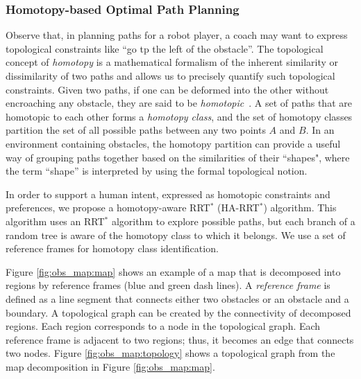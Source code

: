 \documentclass[phd]{byuprop}
\begin{document}
\subsubsection{Homotopy-based Optimal Path Planning}
\label{sec:project_description:homotopy_based_path_planning}

Observe that, in planning paths for a robot player, a coach may want to express topological constraints like ``go tp the left of the obstacle''.
The topological concept of \emph{homotopy} is a mathematical formalism of the inherent similarity or dissimilarity of two paths and allows us to precisely quantify such topological constraints.
Given two paths, if one can be deformed into the other without encroaching any obstacle, they are said to be \emph{homotopic}~\cite{Hernandez2015}.
A set of paths that are homotopic to each other forms a \emph{homotopy class}, and the  set of homotopy classes partition the set of all possible paths between any two points $A$ and $B$.
In an environment containing obstacles, the homotopy partition can provide a useful way of grouping paths together based on the similarities of their ``shapes", where the term ``shape'' is interpreted by using the formal topological notion.

In order to support a human intent, expressed as homotopic constraints and preferences, we propose a homotopy-aware RRT$^{*}$ (HA-RRT$^{*}$) algorithm. 
This algorithm uses an RRT$^*$ algorithm to explore possible paths, but each branch of a random tree is aware of the homotopy class to which it belongs. 
We use a set of reference frames for homotopy class identification.

Figure \ref{fig:obs_map:map} shows an example of a map that is decomposed into regions by reference frames (blue and green dash lines).
A \emph{reference frame} is defined as a line segment that connects either two obstacles or an obstacle and a boundary.
A topological graph can be created by the connectivity of decomposed regions.
Each region corresponds to a node in the topological graph.
Each reference frame is adjacent to two regions; thus, it becomes an edge that connects two nodes.
Figure \ref{fig:obs_map:topology} shows a topological graph from the map decomposition in Figure \ref{fig:obs_map:map}.
\end{document}
